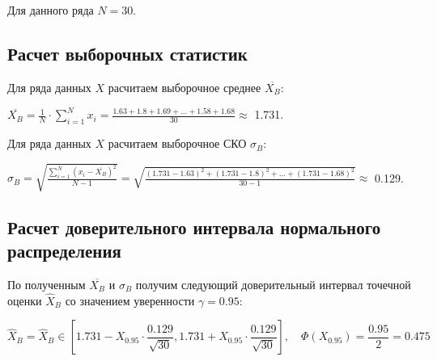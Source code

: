 \documentclass[
]{article}
\begin{document}
Для данного ряда \(N = 30\).

\hypertarget{ux440ux430ux441ux447ux435ux442-ux432ux44bux431ux43eux440ux43eux447ux43dux44bux445-ux441ux442ux430ux442ux438ux441ux442ux438ux43a}{%
\subsection{\texorpdfstring{\textbf{Расчет выборочных
статистик}}{Расчет выборочных статистик}}\label{ux440ux430ux441ux447ux435ux442-ux432ux44bux431ux43eux440ux43eux447ux43dux44bux445-ux441ux442ux430ux442ux438ux441ux442ux438ux43a}}

Для ряда данных \(X\) расчитаем выборочное среднее \(\overline{X_{B}}\):

\(\overline{X_{B}} = \frac{1}{N} \cdot \sum_{i=1}^{N} x_i = \frac{1.63 + 1.8 + 1.69 + \dots + 1.58 + 1.68}{30} \approx\)
1.731.

Для ряда данных \(X\) расчитаем выборочное СКО \({\sigma_{B}}\):

\(\sigma_{B} = \sqrt{\frac{\sum_{i=1}^{N}\left( x_i - \overline{X_{B}} \right)^2}{N-1}} = \sqrt{\frac{(1.731 - 1.63)^2 + (1.731 - 1.8)^2 + \dots + (1.731 - 1.68)^2}{30-1}} \approx\)
0.129.

\hypertarget{ux440ux430ux441ux447ux435ux442-ux434ux43eux432ux435ux440ux438ux442ux435ux43bux44cux43dux43eux433ux43e-ux438ux43dux442ux435ux440ux432ux430ux43bux430-ux43dux43eux440ux43cux430ux43bux44cux43dux43eux433ux43e-ux440ux430ux441ux43fux440ux435ux434ux435ux43bux435ux43dux438ux44f}{%
\subsection{\texorpdfstring{\textbf{Расчет доверительного интервала
нормального
распределения}}{Расчет доверительного интервала нормального распределения}}\label{ux440ux430ux441ux447ux435ux442-ux434ux43eux432ux435ux440ux438ux442ux435ux43bux44cux43dux43eux433ux43e-ux438ux43dux442ux435ux440ux432ux430ux43bux430-ux43dux43eux440ux43cux430ux43bux44cux43dux43eux433ux43e-ux440ux430ux441ux43fux440ux435ux434ux435ux43bux435ux43dux438ux44f}}

По полученным \(\overline{X_{B}}\) и \(\sigma_{B}\) получим следующий
доверительный интервал точечной оценки \(\hat{X}_{B}\) со значением
уверенности \(\gamma = 0.95\):

\[
\hat{X}_{B} = \hat{X}_{B} \in \left[ 1.731 - X_{0.95} \cdot \frac{0.129}{\sqrt{30}}, 1.731 + X_{0.95} \cdot \frac{0.129}{\sqrt{30}} \right], \quad \Phi(X_{0.95}) = \frac{0.95}{2} = 0.475
\]
\end{document}

